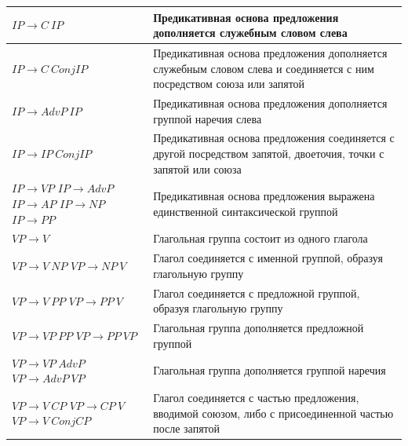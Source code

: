 \begin{longtable}{|L{.35\textwidth}|L{.55\textwidth}|}
	$IP \rightarrow C\ IP$ &
	Предикативная основа предложения дополняется служебным словом слева\\\hline
	
	$IP \rightarrow C\ ConjIP$ &
	Предикативная основа предложения дополняется служебным словом слева и соединяется с ним посредством союза или запятой\\\hline
	
	$IP \rightarrow AdvP\ IP$ &
	Предикативная основа предложения дополняется группой наречия слева\\\hline
	
	$IP \rightarrow IP\ ConjIP$ &
	Предикативная основа предложения соединяется с другой посредством запятой, двоеточия, точки с запятой или союза\\\hline
	
	$IP \rightarrow VP$\newline
	$IP \rightarrow AdvP$\newline
	$IP \rightarrow AP$\newline
	$IP \rightarrow NP$\newline
	$IP \rightarrow PP$ &
	Предикативная основа предложения выражена единственной синтаксической группой\\\hline
	
	$VP \rightarrow V$ &
	Глагольная группа состоит из одного глагола\\\hline
	
	$VP \rightarrow V\ NP$\newline
	$VP \rightarrow NP\ V$ &
	Глагол соединяется с именной группой, образуя глагольную группу\\\hline
	
	$VP \rightarrow V\ PP$\newline
	$VP \rightarrow PP\ V$ &
	Глагол соединяется с предложной группой, образуя глагольную группу\\\hline
	
	$VP \rightarrow VP\ PP$\newline
	$VP \rightarrow PP\ VP$ &
	Глагольная группа дополняется предложной группой\\\hline
	
	$VP \rightarrow VP\ AdvP$\newline
	$VP \rightarrow AdvP\ VP$ &
	Глагольная группа дополняется группой наречия\\\hline
	
	$VP \rightarrow V\ CP$\newline
	$VP \rightarrow CP\ V$\newline
	$VP \rightarrow V\ ConjCP$ &
	Глагол соединяется с частью предложения, вводимой союзом, либо с присоединенной частью после запятой\\\hline
	

\end{longtable}
